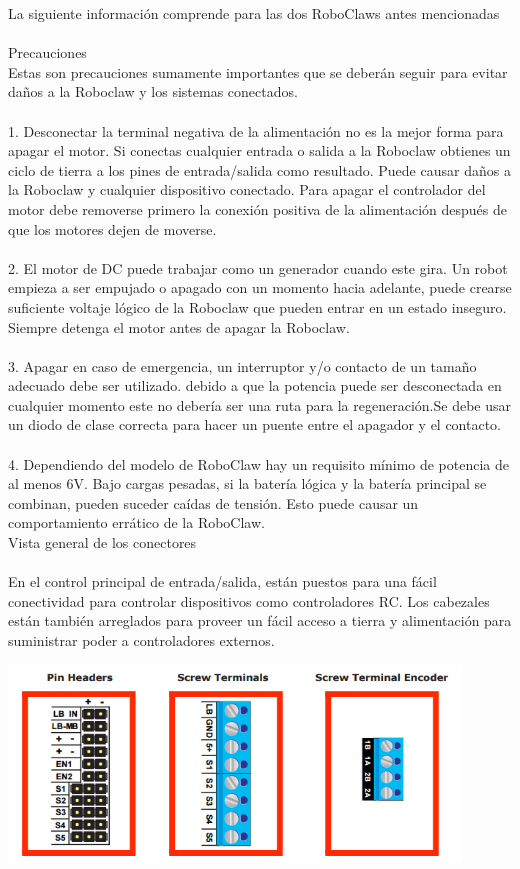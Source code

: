 \documentclass[a4paper,usenames,dvipsnames,svgnames,table]{book}
\begin{document}
La siguiente información comprende para las dos RoboClaws antes mencionadas \\
\\
Precauciones\\
Estas son precauciones sumamente importantes que se deberán seguir para evitar daños a la Roboclaw y los sistemas conectados.\\
\\
1. Desconectar la terminal negativa de la alimentación no es la mejor forma para apagar el motor. Si conectas cualquier entrada o salida a la Roboclaw obtienes un ciclo de tierra a los pines de entrada/salida como resultado. Puede causar daños a la Roboclaw y cualquier dispositivo conectado. Para apagar el controlador del motor debe removerse primero la conexión positiva de la alimentación después de que los motores dejen de moverse.\\
\\
2. El motor de DC puede trabajar como un generador cuando este gira. Un robot empieza a ser empujado o apagado con un momento hacia adelante, puede crearse suficiente voltaje lógico de la Roboclaw que pueden entrar en un estado inseguro. Siempre detenga el motor antes de apagar la Roboclaw.\\
\\
3. Apagar en caso de emergencia, un interruptor y/o contacto de un tamaño adecuado debe ser utilizado. debido a que la potencia puede ser desconectada en cualquier momento este no debería ser una ruta para la regeneración.Se debe usar un diodo de clase correcta para hacer un puente entre el apagador y el contacto.\\
\\
4. Dependiendo del modelo de RoboClaw hay un requisito mínimo de potencia de al menos 6V. Bajo cargas pesadas, si la batería lógica y la batería principal se combinan, pueden suceder caídas de tensión. Esto puede causar un comportamiento errático de la RoboClaw.\\
Vista general de los conectores\\
\\
En el control principal de entrada/salida, están puestos para una fácil conectividad para controlar dispositivos como controladores RC. Los cabezales están también arreglados para proveer un fácil acceso a tierra  y alimentación para suministrar poder a controladores externos.

\begin{center}
\includegraphics[width=0.9\textwidth]{Figures/Hardware/Partes/Pines.png}
\label{fig:Hardware:Partes:Pines}
\end{center}
\end{document}
